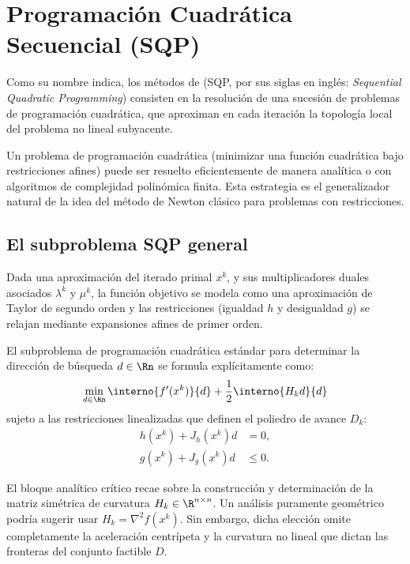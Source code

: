 
\section{Programación Cuadrática Secuencial (SQP)}
\label{sec:v2_metodos_sqp}

Como su nombre indica, los métodos de  (SQP, por sus siglas en inglés: \textit{Sequential Quadratic Programming}) consisten en la resolución de una sucesión de problemas de programación cuadrática, que aproximan en cada iteración la topología local del problema no lineal subyacente. 

Un problema de programación cuadrática (minimizar una función cuadrática bajo restricciones afines) puede ser resuelto eficientemente de manera analítica o con algoritmos de complejidad polinómica finita. Esta estrategia es el generalizador natural de la idea del método de Newton clásico para problemas con restricciones.

\subsection{El subproblema SQP general}

Dada una aproximación del iterado primal $x^k$, y sus multiplicadores duales asociados $\lambda^k$ y $\mu^k$, la función objetivo se modela como una aproximación de Taylor de segundo orden y las restricciones (igualdad $h$ y desigualdad $g$) se relajan mediante expansiones afines de primer orden.

El subproblema de programación cuadrática estándar para determinar la dirección de búsqueda $d \in \Rn$ se formula explícitamente como:
\begin{equation}
    \min_{d \in \Rn} \interno{f'(x^k)}{d} + \frac{1}{2}\interno{H_k d}{d}
    \label{eq:v2_sqp_obj}
\end{equation}
sujeto a las restricciones linealizadas que definen el poliedro de avance $D_k$:
\begin{align}
    h(x^k) + J_h(x^k)d &= 0, \label{eq:v2_sqp_rest_h} \\
    g(x^k) + J_g(x^k)d &\le 0. \label{eq:v2_sqp_rest_g}
\end{align}

El bloque analítico crítico recae sobre la construcción y determinación de la matriz simétrica de curvatura $H_k \in \R^{n \times n}$. Un análisis puramente geométrico podría sugerir usar $H_k = \nabla^2 f(x^k)$. Sin embargo, dicha elección omite completamente la aceleración centrípeta y la curvatura no lineal que dictan las fronteras del conjunto factible $D$.

